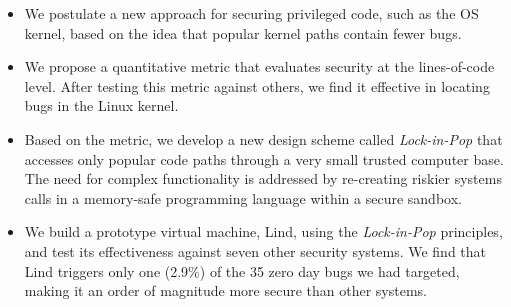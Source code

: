 \begin{itemize}\setlength\itemsep{0em}
\item
We postulate a new approach for securing privileged code,
such as the OS kernel, based on the idea that popular kernel paths contain fewer bugs.

\item
We propose a quantitative metric that evaluates security
 at the lines-of-code level.
After testing this metric against others, we find it effective in locating
 bugs in the Linux kernel.

\item
Based on the metric, we develop a new design scheme called \emph{Lock-in-Pop} that
accesses only popular code paths
through a very small trusted computer base.
The need for complex functionality is addressed by re-creating riskier systems calls
in a memory-safe programming language within a secure sandbox.

\item
We build a prototype virtual machine, Lind, using the \emph{Lock-in-Pop} principles,
 and test its effectiveness against seven other security systems. We find that
 Lind triggers only one
(2.9\%) of the 35 zero day bugs we had targeted,
making it an order of magnitude more secure than other systems.
\end{itemize}

%
